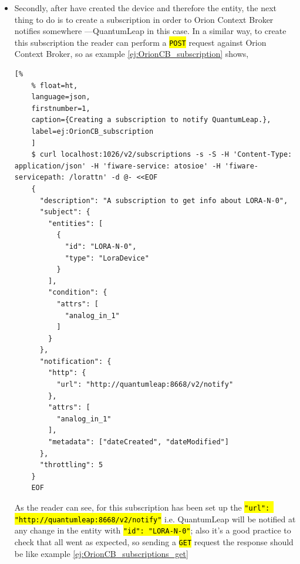 \documentclass[11pt,a4paper,dvipsnames,twoside]{article}
\newcommand{\cmd}[1] {\hl{\texttt{#1}}}
\begin{document}
\begin{itemize}
  \item Secondly, after have created the device and therefore the entity, the next thing to do is to create a subscription in order to Orion Context Broker notifies somewhere ---QuantumLeap in this case. In a similar way, to create this subscription the reader can perform a \cmd{POST} request against Orion Context Broker, so as example \ref{ej:OrionCB_subscription} shows, 
  
  \begin{lstlisting}[%
    % float=ht,
    language=json,
    firstnumber=1,
    caption={Creating a subscription to notify QuantumLeap.},
    label=ej:OrionCB_subscription
    ]
    $ curl localhost:1026/v2/subscriptions -s -S -H 'Content-Type: application/json' -H 'fiware-service: atosioe' -H 'fiware-servicepath: /lorattn' -d @- <<EOF
    {
      "description": "A subscription to get info about LORA-N-0",
      "subject": {
        "entities": [
          {
            "id": "LORA-N-0",
            "type": "LoraDevice"
          }
        ],
        "condition": {
          "attrs": [
            "analog_in_1"
          ]
        }
      },
      "notification": {
        "http": {
          "url": "http://quantumleap:8668/v2/notify"
        },
        "attrs": [
          "analog_in_1"
        ],
        "metadata": ["dateCreated", "dateModified"]
      },
      "throttling": 5
    }
    EOF
  \end{lstlisting}

  As the reader can see, for this subscription has been set up the \cmd{"url": "http://quantumleap:8668/v2/notify"} i.e. QuantumLeap will be notified at any change in the entity with \cmd{"id": "LORA-N-0"}; also it's a good practice to check that all went as expected, so sending a \cmd{GET} request the response should be like example \ref{ej:OrionCB_subscriptions_get} 


\end{itemize}
\end{document}
